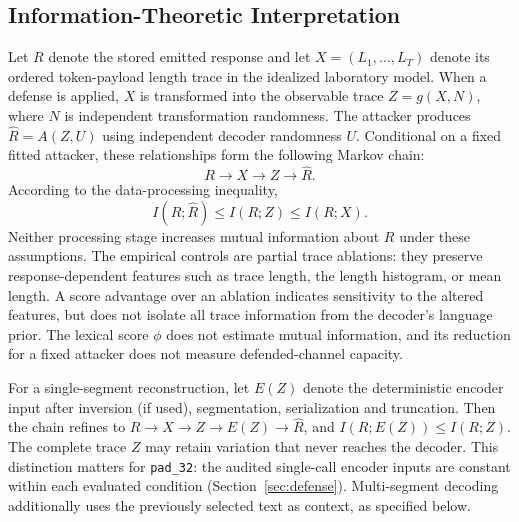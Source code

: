 \documentclass[electronics,article,submit,pdftex,moreauthors]{Definitions/mdpi}
\begin{document}
\subsection{Information-Theoretic Interpretation}
Let $R$ denote the stored emitted response and let $X=(L_1,\ldots,L_T)$ denote its ordered token-payload length trace in the idealized laboratory model. When a defense is applied, $X$ is transformed into the observable trace $Z=g(X,N)$, where $N$ is independent transformation randomness. The attacker produces $\widehat{R}=A(Z,U)$ using independent decoder randomness $U$. Conditional on a fixed fitted attacker, these relationships form the following Markov chain:
\begin{equation}
R \longrightarrow X \longrightarrow Z \longrightarrow \widehat{R}.
\end{equation}
According to the data-processing inequality,
\begin{equation}
I(R;\widehat{R}) \leq I(R;Z) \leq I(R;X).
\end{equation}
Neither processing stage increases mutual information about $R$ under these assumptions. The empirical controls are partial trace ablations: they preserve response-dependent features such as trace length, the length histogram, or mean length. A score advantage over an ablation indicates sensitivity to the altered features, but does not isolate all trace information from the decoder's language prior. The lexical score $\phi$ does not estimate mutual information, and its reduction for a fixed attacker does not measure defended-channel capacity.

For a single-segment reconstruction, let $E(Z)$ denote the deterministic encoder input after inversion (if used), segmentation, serialization and truncation. Then the chain refines to $R\rightarrow X\rightarrow Z\rightarrow E(Z)\rightarrow\widehat R$, and $I(R;E(Z))\leq I(R;Z)$. The complete trace $Z$ may retain variation that never reaches the decoder. This distinction matters for \texttt{pad\_32}: the audited single-call encoder inputs are constant within each evaluated condition (Section~\ref{sec:defense}). Multi-segment decoding additionally uses the previously selected text as context, as specified below.
\end{document}
